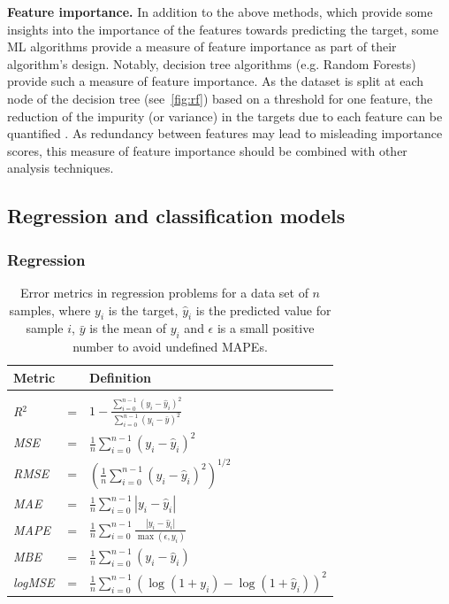 \textbf{Feature importance.} In addition to the above methods, which provide some insights into the importance of the features towards predicting the target, some ML algorithms provide a measure of feature importance as part of their algorithm's design.
Notably, decision tree algorithms (e.g. Random Forests) provide such a measure of feature importance. As the dataset is split at each node of the decision tree (see~\ref{fig:rf}) based on a threshold for one feature, the reduction of the impurity (or variance) in the targets due to each feature can be quantified \cite{breiman_random_2001}.
As redundancy between features may lead to misleading importance scores, this measure of feature importance should be combined with other analysis techniques.

\subsection{Regression and classification models}
\label{ML_models}
\label{RF}

\subsubsection{Regression}

\begin{table}[b]
\footnotesize
\centering
\caption{Error metrics in regression problems for a data set of $n$ samples, where $y_i$ is the target, $\hat{y}_i$ is the predicted value for sample $i$, $\bar{y}$ is the mean of $y_i$ and $\epsilon$ is a small positive number to avoid undefined MAPEs.} %
\label{tab:error_metrics}
\begin{tabular}{lcl}
\hline
\textbf{Metric} & & \textbf{Definition} \\ \hline
&&\\[-2ex]
\textit{R$^2$} &=& $\displaystyle 1-\frac{\sum_{i=0}^{n-1}\left(y_{i}-\hat{y}_{i}\right)^{2}}{\sum_{i=0}^{n-1}\left(y_{i}-\bar{y}\right)^{2}}$ \\[3ex]
\textit{MSE} &=& $\displaystyle \frac{1}{n} \sum_{i=0}^{n-1}\left( y_i - \hat{y}_i \right)^2$ \\[3ex]
\textit{RMSE} &=& $\displaystyle \left(\frac{1}{n} \sum_{i=0}^{n-1}\left( y_i - \hat{y}_i \right)^2\right)^{1/2}$ \\[3ex]
\textit{MAE} &=& $\displaystyle \frac{1}{n} \sum_{i=0}^{n-1}\left| y_i - \hat{y}_i \right| $ \\[3ex]
\textit{MAPE} &=& $\displaystyle \frac{1}{n} \sum_{i=0}^{n-1} \frac{\left| y_i - \hat{y}_i \right|}{\max(\epsilon,y_i)}$ \\[3ex]
\textit{MBE} &=& $\displaystyle \frac{1}{n} \sum_{i=0}^{n-1}\left( y_i - \hat{y}_i \right) $\\[3ex]
\textit{logMSE} &=& $\displaystyle \frac{1}{n} \sum_{i=0}^{n-1}\left( \log(1 + y_i) - \log(1 + \hat{y}_i) \right)^2$ \\[2ex] \hline
\end{tabular}
\end{table}

